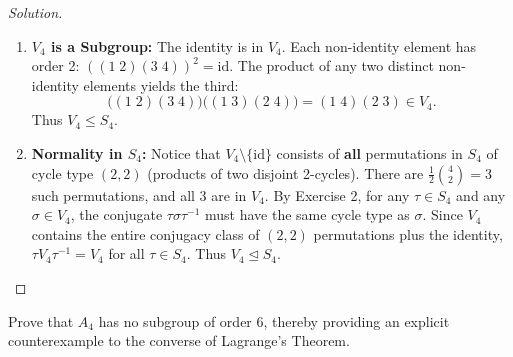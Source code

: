 \begin{proof}[Solution]
\begin{enumerate}[label=\arabic*., leftmargin=*]
    \item \textbf{$V_4$ is a Subgroup:}
    The identity is in $V_4$.
    Each non-identity element has order 2: $((1 \; 2)(3 \; 4))^2 = \text{id}$.
    The product of any two distinct non-identity elements yields the third:
    \begin{equation*}
    \bigl((1 \; 2)(3 \; 4)\bigr)\bigl((1 \; 3)(2 \; 4)\bigr) = (1 \; 4)(2 \; 3) \in V_4.
    \end{equation*}
    Thus $V_4 \le S_4$.

    \item \textbf{Normality in $S_4$:}
    Notice that $V_4 \setminus \{\text{id}\}$ consists of \textbf{all} permutations in $S_4$ of cycle type $(2, 2)$ (products of two disjoint 2-cycles).
    There are $\frac{1}{2} \binom{4}{2} = 3$ such permutations, and all 3 are in $V_4$.
    By Exercise 2, for any $\tau \in S_4$ and any $\sigma \in V_4$, the conjugate $\tau \sigma \tau^{-1}$ must have the same cycle type as $\sigma$.
    Since $V_4$ contains the entire conjugacy class of $(2, 2)$ permutations plus the identity, $\tau V_4 \tau^{-1} = V_4$ for all $\tau \in S_4$.
    Thus $V_4 \trianglelefteq S_4$.
\end{enumerate}
\end{proof}

\begin{problem}
Prove that $A_4$ has no subgroup of order 6, thereby providing an explicit counterexample to the converse of Lagrange's Theorem.
\end{problem}

